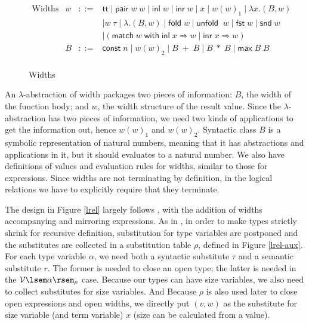 \documentclass[preprint]{sigplanconf}
\newcommand{\symmatch}{\mathsf{match}}
\newcommand{\symwith}{\mathsf{\;with\;}}
\newcommand{\syminl}{\mathsf{inl}}
\newcommand{\syminr}{\mathsf{inr}}
\newcommand{\symmax}{\mathsf{max}}
\newcommand{\symfold}{\mathsf{fold}}
\newcommand{\symunfold}{\mathsf{unfold}}
\newcommand{\sympair}{\mathsf{pair}}
\newcommand{\symtt}{\mathsf{tt}}
\newcommand{\relV}[1]{\mathcal{V}\lsem#1\rsem}
\newcommand{\symfst}{\mathsf{fst}}
\newcommand{\symsnd}{\mathsf{snd}}
\begin{document}
\begin{figure}
$$\begin{array}{rrcl}
  \textrm{Widths} & w &::=& \symtt \mid \sympair\;w\;w \mid \syminl\;w \mid \syminr\;w \mid x \mid w(w)_1 \mid \lambda x.(B,w) \\
  & & & \mid w\;\tau \mid \lambda.(B,w) \mid \symfold\; w \mid \symunfold\;\;w \mid \symfst\;w \mid \symsnd\;w \\
  & & & \mid (\symmatch\;w \symwith\syminl\;x\Rightarrow w\;|\;\syminr\;x\Rightarrow w) \\
  & B &::=& \mathsf{const}\;n \mid w(w)_2 \mid B\;+\;B \mid B\;*\;B \mid \symmax\;B\;B \\
\end{array}$$
\caption{\label{widths}Widths}
\end{figure}

An $\lambda$-abstraction of width packages two pieces of information: $B$, the width of the function body; and $w$, the width structure of the result value. Since the $\lambda$-abstraction has two pieces of information, we need two kinds of applications to get the information out, hence $w(w)_1$ and $w(w)_2$. Syntactic class $B$ is a symbolic representation of natural numbers, meaning that it has abstractions and applications in it, but it should evaluates to a natural number. We also have definitions of values and evaluation rules for widths, similar to those for expressions. Since widths are not terminating by definition, in the logical relations we have to explicitly require that they terminate.

The design in Figure \ref{lrel} largely follows \cite{dreyer2009logical}, with the addition of widths accompanying and mirroring expressions. As in \cite{dreyer2009logical}, in order to make types strictly shrink for recursive definition, substitution for type variables are postponed and the substitutes are collected in a substitution table $\rho$, defined in Figure \ref{lrel-aux}. For each type variable $\alpha$, we need both a syntactic substitute $\tau$ and a semantic substitute $r$. The former is needed to close an open type; the latter is needed in the $\relV{\alpha}_\rho$ case. Because our types can have size variables, we also need to collect substitutes for size variables. And Because $\rho$ is also used later to close open expressions and open widths, we directly put $(v,w)$ as the substitute for size variable (and term variable) $x$ (size can be calculated from a value).
\end{document}
